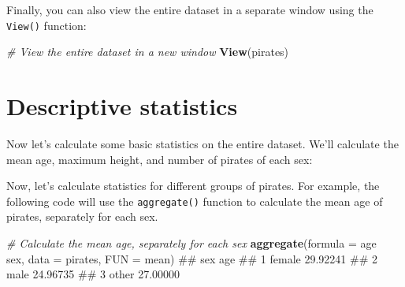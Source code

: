 \documentclass[]{book}
\newenvironment{Shaded}{\begin{snugshade}}{\end{snugshade}}
\newcommand{\KeywordTok}[1]{\textcolor[rgb]{0.13,0.29,0.53}{\textbf{#1}}}
\newcommand{\DataTypeTok}[1]{\textcolor[rgb]{0.13,0.29,0.53}{#1}}
\newcommand{\StringTok}[1]{\textcolor[rgb]{0.31,0.60,0.02}{#1}}
\newcommand{\CommentTok}[1]{\textcolor[rgb]{0.56,0.35,0.01}{\textit{#1}}}
\newcommand{\OperatorTok}[1]{\textcolor[rgb]{0.81,0.36,0.00}{\textbf{#1}}}
\newcommand{\NormalTok}[1]{#1}
\theoremstyle{definition}
\theoremstyle{definition}
\theoremstyle{remark}
\begin{document}
Finally, you can also view the entire dataset in a separate window using
the \texttt{View()} function:

\begin{Shaded}
\begin{Highlighting}[]
\CommentTok{# View the entire dataset in a new window}
\KeywordTok{View}\NormalTok{(pirates)}
\end{Highlighting}
\end{Shaded}

\section{Descriptive statistics}\label{descriptive-statistics}

Now let's calculate some basic statistics on the entire dataset. We'll
calculate the mean age, maximum height, and number of pirates of each
sex:

\begin{Shaded}
\end{Shaded}

Now, let's calculate statistics for different groups of pirates. For
example, the following code will use the \texttt{aggregate()} function
to calculate the mean age of pirates, separately for each sex.

\begin{Shaded}
\begin{Highlighting}[]
\CommentTok{# Calculate the mean age, separately for each sex}
\KeywordTok{aggregate}\NormalTok{(}\DataTypeTok{formula =}\NormalTok{ age }\OperatorTok{~}\StringTok{ }\NormalTok{sex,}
          \DataTypeTok{data =}\NormalTok{ pirates,}
          \DataTypeTok{FUN =}\NormalTok{ mean)}
\NormalTok{##      sex      age}
\NormalTok{## 1 female 29.92241}
\NormalTok{## 2   male 24.96735}
\NormalTok{## 3  other 27.00000}
\end{Highlighting}
\end{Shaded}
\end{document}
